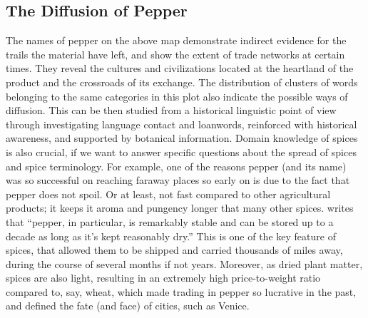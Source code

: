



\subsection{The Diffusion of Pepper}

The names of pepper on the above map demonstrate indirect evidence for the trails the material have left, and show the extent of trade networks at certain times. They reveal the cultures and civilizations located at the heartland of the product and the crossroads of its exchange. The distribution of clusters of words belonging to the same categories in this plot also indicate the possible ways of diffusion. This can be then studied from a historical linguistic point of view through investigating language contact and loanwords, reinforced with historical awareness, and supported by botanical information. Domain knowledge of spices is also crucial, if we want to answer specific questions about the spread of spices and spice terminology. For example, one of the reasons pepper (and its name) was so successful on reaching faraway places so early on is due to the fact that pepper does not spoil. Or at least, not fast compared to other agricultural products; it keeps it aroma and pungency longer that many other spices. \textcite[59]{krondl_taste_2007} writes that ``pepper, in particular, is remarkably stable and can be stored up to a decade as long as it’s kept reasonably dry.'' This is one of the key feature of spices, that allowed them to be shipped and carried thousands of miles away, during the course of several months if not years. Moreover, as dried plant matter, spices are also light, resulting in an extremely high price-to-weight ratio compared to, say, wheat, which made trading in pepper so lucrative in the past, and defined the fate (and face) of cities, such as Venice.

